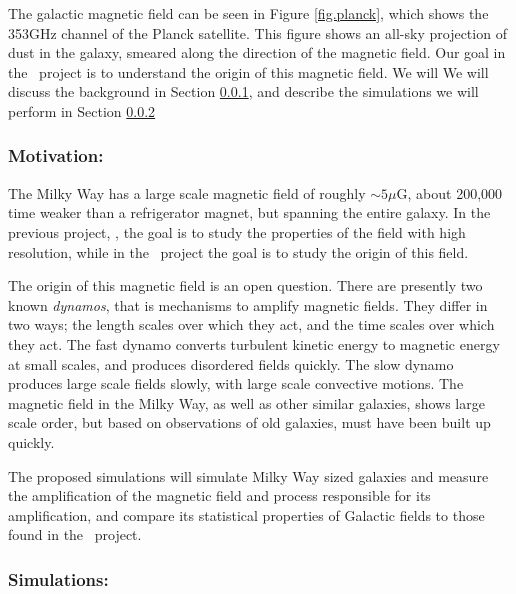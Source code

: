 The galactic magnetic field can be seen in Figure \ref{fig.planck}, which shows
the 353GHz channel of the Planck satellite.  This figure
shows an all-sky projection of dust in the galaxy, smeared along the direction of
the magnetic field.  Our goal in the \nameGalaxies\ project is to understand the
origin of this magnetic field.   We will We will discuss the background in Section
\ref{subsec.galaxies_motivate}, and describe the simulations we will perform in
Section \ref{subsec.galaxies_sims}

\subsubsection{Motivation: \nameGalaxies}
\label{subsec.galaxies_motivate}

The Milky Way has a large scale magnetic
field of roughly $\sim 5 \mu$G, about 200,000 time weaker than a refrigerator
magnet, but spanning the entire galaxy.   In the previous project, \nameCMB, the
goal is to study the properties of the field with high resolution, while in
the \nameGalaxies\ project the goal is to study the origin of this field.

The origin of this magnetic field is an open question.  There are presently two
known \emph{dynamos}, that is mechanisms to amplify magnetic fields. They differ in
two ways; the length scales over which they act, and the time scales over which
they act.  The fast
dynamo converts turbulent kinetic energy to magnetic energy at small scales, and
produces disordered fields quickly.  The slow dynamo produces large scale fields
slowly, with large scale convective motions. The magnetic field in the Milky Way, as well as other similar galaxies,
shows large scale order, but based on observations of old galaxies, must have been
built up quickly. 

The proposed simulations will simulate Milky Way sized galaxies and measure the
amplification of the magnetic field and process responsible for its amplification, and compare its
statistical properties of Galactic fields to those found in the \nameCMB\
project.

\subsubsection{Simulations: \nameGalaxies}
\label{subsec.galaxies_sims}

